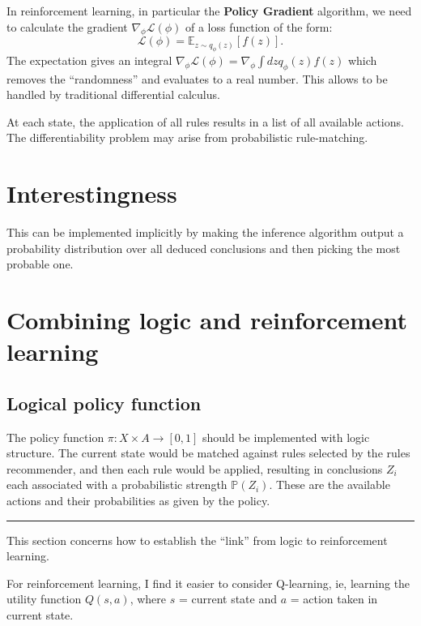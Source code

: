 In reinforcement learning, in particular the \textbf{Policy Gradient} algorithm, we need to calculate the gradient $\nabla_\phi \mathcal{L}(\phi)$ of a loss function of the form:
\begin{equation}
\mathcal{L}(\phi) = \mathbb{E}_{z \sim q_\phi(z)}[ f(z) ] .
\end{equation}
The expectation gives an integral $\displaystyle \nabla_\phi \mathcal{L}(\phi) = \nabla_\phi \int dz q_\phi(z) f(z)$ which removes the ``randomness'' and evaluates to a real number.  This allows to be handled by traditional differential calculus.

At each state, the application of all rules results in a list of all available actions.  The differentiability problem may arise from probabilistic rule-matching.  

\section{Interestingness}

This can be implemented implicitly by making the inference algorithm output a probability distribution over all deduced conclusions and then picking the most probable one.

\section{Combining logic and reinforcement learning}

\subsection{Logical policy function}

The policy function $\pi: X \times A \rightarrow [0,1]$ should be implemented with logic structure.  The current state would be matched against rules selected by the rules recommender, and then each rule would be applied, resulting in conclusions $Z_i$ each associated with a probabilistic strength $\mathbb{P}(Z_i)$.  These are the available actions and their probabilities as given by the policy.

\vspace{1cm} \hrule \vspace{1cm}

This section concerns how to establish the ``link'' from logic to reinforcement learning.

For reinforcement learning, I find it easier to consider Q-learning, ie, learning the utility function $Q(s,a)$, where $s$ = current state and $a$ = action taken in current state.

